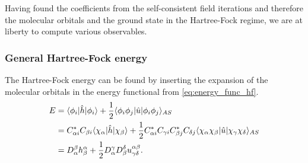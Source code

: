             Having found the coefficients from the self-consistent field
            iterations and therefore the molecular orbitals and the ground state
            in the Hartree-Fock regime, we are at liberty to compute various
            observables.

            \subsubsection{General Hartree-Fock energy}
                The Hartree-Fock energy can be found by inserting the expansion
                of the molecular orbitals in the energy functional from
                \autoref{eq:energy_func_hf}.
                \begin{align}
                    E
                    &= \langle \phi_i |\hat{h}| \phi_i \rangle
                    + \frac{1}{2}\langle \phi_i\phi_j |\hat{u}| \phi_i\phi_j \rangle_{AS}
                    \\
                    &=
                    C^{*}_{\alpha i} C_{\beta i}
                    \langle \chi_{\alpha} |\hat{h}| \chi_{\beta} \rangle
                    + \frac{1}{2}
                    C^{*}_{\alpha i} C_{\gamma i}
                    C^{*}_{\beta j} C_{\delta j}
                    \langle \chi_{\alpha}\chi_{\beta} |\hat{u}
                    | \chi_{\gamma}\chi_{\delta} \rangle_{AS}
                    \\
                    &=
                    D^{\beta}_{\alpha} h^{\alpha}_{\beta}
                    + \frac{1}{2}
                    D^{\gamma}_{\alpha} D^{\delta}_{\beta}
                    u^{\alpha \beta}_{\gamma \delta}.
                    \label{eq:general-hartree-fock-energy}
                \end{align}

